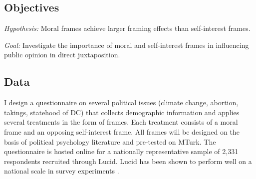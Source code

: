 \documentclass[11pt]{article}
\begin{document}



\subsection{Objectives}

\textit{Hypothesis:} Moral frames achieve larger framing effects than self-interest frames.\par
\noindent \textit{Goal:} Investigate the importance of moral and self-interest frames in influencing public opinion in direct juxtaposition.



\subsection{Data}

I design a questionnaire on several political issues (climate change, abortion, takings, statehood of DC) that collects demographic information and applies several treatments in the form of frames. Each treatment consists of a moral frame and an opposing self-interest frame. All frames will be designed on the basis of political psychology literature and pre-tested on MTurk. The questionnaire is hosted online for a nationally representative sample of 2,331 respondents recruited through Lucid. Lucid  has been shown to perform well on a national scale in survey experiments \citep{coppock_2019_validating}. 
\end{document}
